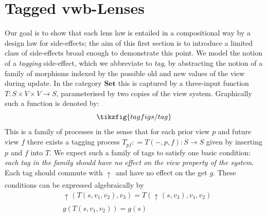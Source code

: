 \documentclass[a4paper,11pt]{article}
\newcommand{\putt}[1]{\mathbin{\uparrow_{#1}}}
\theoremstyle{definition}
\theoremstyle{plain}
\theoremstyle{plain}
\theoremstyle{definition}
\begin{document}
\section{Tagged vwb-Lenses}
Our goal is to show that each lens law is entailed in a compositional way by a design law for side-effects; the aim of this first section is to introduce a limited class of side-effects broad enough to demonstrate this point. We model the notion of a \textit{tagging} side-effect, which we abbreviate to \textit{tag}, by abstracting the notion of a family of morphisms indexed by the possible old and new values of the view during update. In the category $\mathbf{Set}$ this is captured by a three-input function $T:S \times V \times V \rightarrow S$, parameterised by two copies of the view system. Graphically such a function is denoted by:
\[\tikzfig{tagfigs/tag}\]
This is a family of processes in the sense that for each prior view $p$ and future view $f$ there exists a tagging process $T_{pf}: = T(-,p,f):S \rightarrow S$ given by inserting $p$ and $f$ into $T$. %
We expect such a family of tags to satisfy one basic condition: \textit{each tag in the family should have no effect on the view property of the system}. Each tag should commute with $\putt{}$ and have no effect on the get $g$. These conditions can be expressed algebraically by
\begin{align*}
    & \putt{}(T(s,v_1,v_2),v_3) = T(\putt{}(s,v_3),v_1,v_2) \\
    & g(T(s,v_1,v_2)) = g(s)
\end{align*}
\end{document}
